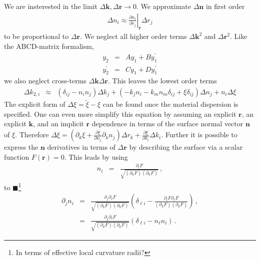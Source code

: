 \documentclass[12pt,a4paper,twoside,openright,BCOR10mm,headsepline,titlepage,abstracton,chapterprefix,final]{scrreprt}
\newcommand\Vector[1]{{\mathbf{#1}}}
\newcommand\wavenumber{k}
\newcommand\Wavevector{\Vector{\wavenumber}}
\newcommand{\remark}[1]{{\color{red}$\blacksquare$}\footnote{{\color{red}#1}}}
\begin{document}
We are insterested in the limit $\Delta\Wavevector, \Delta\Vector{r} \rightarrow 0$. We approximate $\Delta\Vector{n}$ in first order
\begin{eqnarray}
 \Delta n_i \approx \left. \frac{\partial n_i}{\partial r_j} \right|_{\Vector{r}} \Delta r_j
\end{eqnarray}
to be proportional to $\Delta\Vector{r}$. 
We neglect all higher order terms $\Delta\Wavevector^2$ and $\Delta\Vector{r}^2$.
Like the ABCD-matrix formalism, 
\begin{eqnarray}
 y_2 &=& A y_1 + B y^\prime_1 \\
 y^\prime_2 &=& C y_1 + D y^\prime_1
\end{eqnarray}
we also neglect cross-terms $\Delta\Wavevector\Delta\Vector{r}$. 
This leaves the lowest order terms
\begin{eqnarray}
 \Delta \wavenumber_{2,i} &\approx& 
   \left( \delta_{ij}  - n_i n_j \right) \Delta\wavenumber_j
   +
   \left(
     - \wavenumber_j  n_i 
     - \wavenumber_m n_m \delta_{ij}  
     + \xi \delta_{ij}
   \right) \Delta n_j
   + n_i \Delta\xi 
\end{eqnarray}
The explicit form of $\Delta\xi = \tilde{\xi} - \xi$ can be found once the material dispersion is specified.
One can even more simplify this equation by assuming an explicit $\Vector{r}$, an explicit $\Vector{k}$, and an implicit $\Vector{r}$ dependence in terms
of the surface normal vector $\Vector{n}$ of $\xi$. Therefore 
$\Delta \xi = \left(\partial_k \xi + \frac{\partial \xi}{\partial n_j} \partial_k n_j\right) \Delta r_k + \tfrac{\partial \xi}{\partial k_i} \Delta k_i$. 
Further it is possible to express the $\Vector{n}$ derivatives in terms of $\Delta \Vector{r}$ by describing the surface via
a scalar function $F(\Vector{r}) = 0$. This leads by using
\begin{eqnarray}
 n_i &=& \frac{\partial_i F}{\sqrt{(\partial_k F)(\partial_k F)}}\,,
\end{eqnarray}
to
\remark{In terms of effective local curvature radii?}
\begin{eqnarray}
  \partial_j n_i &=& \frac{\partial_j \partial_\ell F}{\sqrt{(\partial_k F)(\partial_k F)}} \left(\delta_{\ell i} - \frac{\partial_i F \partial_\ell F}{(\partial_k F)(\partial_k F)}\right)\,,\\
    &=& \frac{\partial_j \partial_\ell F}{\sqrt{(\partial_k F)(\partial_k F)}} \left(\delta_{\ell i} - n_\ell n_i\right)\,.\label{eq:nderivative}
\end{eqnarray}
\end{document}
